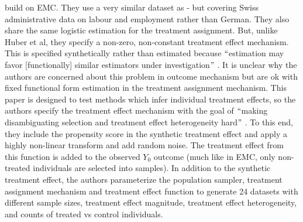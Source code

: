 \documentclass[../main.tex]{subfiles}
\begin{document}
\vspace{\baselineskip}
\cite{Knaus2018MachineEvidence} build on EMC. They use a very similar dataset as \cite{Huber2013TheScore} - but covering Swiss administrative data on labour and employment rather than German. They also share the same logistic estimation for the treatment assignment. But, unlike Huber et al, they specify a non-zero, non-constant treatment effect mechanism. This is specified synthetically rather than estimated because $``$estimation may favor [functionally] similar estimators under investigation$"$ . It is unclear why the authors are concerned about this problem in outcome mechanism but are ok with fixed functional form estimation in the treatment assignment mechanism. This paper is designed to test methods which infer individual treatment effects, so the authors specify the treatment effect mechanism with the goal of $``$making disambiguating selection and treatment effect heterogeneity hard$"$ . To this end, they include the propensity score in the synthetic treatment effect and apply a highly non-linear transform and add random noise. The treatment effect from this function is added to the observed  \( Y_{0} \) outcome (much like in EMC, only non-treated individuals are selected into samples). In addition to the synthetic treatment effect, the authors parameterize the population sampler, treatment assignment mechanism and treatment effect function to generate 24 datasets with different sample sizes, treatment effect magnitude, treatment effect heterogeneity, and counts of treated vs control individuals.\par


\vspace{\baselineskip}

\vspace{\baselineskip}


\end{document}
